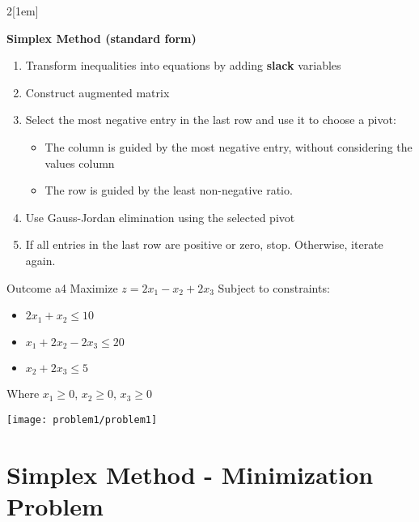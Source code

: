 \begin{multicols}{2}[\columnsep1em] 

    \textbf{Simplex Method (standard form)}
    \begin{enumerate}
        \item Transform inequalities into equations by adding \textbf{slack} variables
        \item Construct augmented matrix
        \item Select the most negative entry in the last row and use it to choose a pivot:
            \begin{itemize}
                \item The column is guided by the most negative entry, without considering the values column
                \item The row is guided by the least non-negative ratio.
            \end{itemize}
        \item Use Gauss-Jordan elimination using the selected pivot
        \item If all entries in the last row are positive or zero, stop. Otherwise, iterate again.
    \end{enumerate}

    \columnbreak

    \begin{problem}{Outcome a}{4}
        Maximize $z = 2x_1 - x_2 + 2x_3$ \newline\newline
        Subject to constraints:
        \begin{itemize}
            \item $2x_1 + x_2 \leq 10$
            \item $x_1 + 2x_2 - 2x_3 \leq 20$
            \item $x_2 + 2x_3 \leq 5$
        \end{itemize}
        Where $x_1 \geq 0$, $x_2 \geq 0$, $x_3 \geq 0$
    \end{problem}
\end{multicols}

\begin{center}
    \texttt{[image: problem1/problem1]}%
\end{center}

\section{Simplex Method - Minimization Problem}

